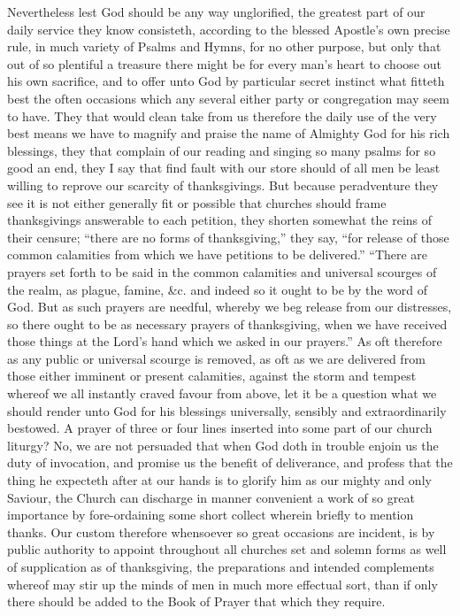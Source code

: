 Nevertheless lest God should be any way unglorified, the greatest part of our daily service they know consisteth, according to the blessed Apostle’s own precise rule, in much variety of Psalms and Hymns, for no other purpose, but only that out of so plentiful a treasure there might be for every man’s heart to choose out his own sacrifice, and to offer unto God by particular secret instinct what fitteth best the often occasions which any several either party or congregation may seem to have. They that would clean take from us therefore the daily use of the very best means we have to magnify and praise the name of Almighty God for his rich blessings, they that complain of our reading and singing so many psalms for so good an end, they I say that find fault with our store should of all men be least willing to reprove our scarcity of thanksgivings.
But because peradventure they see it is not either generally fit or possible that churches should frame thanksgivings answerable to each petition, they shorten somewhat the reins of their censure; “there are no forms of thanksgiving,” they say, “for release of those common calamities from which we have petitions to be delivered.” “There are prayers set forth to be said in the common calamities and universal scourges of the realm, as plague, famine, \&c. and indeed so it ought to be by the word of God. But as such prayers are needful, whereby we beg release from our distresses, so there ought to be as necessary prayers of thanksgiving, when we have received those things at the Lord’s hand which we asked in our prayers.” As oft therefore as any public or universal scourge is removed, as oft as we are delivered from those either imminent or present calamities, against the storm and tempest whereof we all instantly craved favour from above, let it be a question what we should render unto God for his blessings universally, sensibly and extraordinarily bestowed. A prayer of three or four lines inserted into some part of our church liturgy? No, we are not persuaded that when God doth in trouble enjoin us the duty of invocation, and promise us the benefit of deliverance, and profess that the thing he expecteth  after at our hands is to glorify him as our mighty and only Saviour, the Church can discharge in manner convenient a work of so great importance by fore-ordaining some short collect wherein briefly to mention thanks. Our custom therefore whensoever so great occasions are incident, is by public authority to appoint throughout all churches set and solemn forms as well of supplication as of thanksgiving, the preparations and intended complements whereof may stir up the minds of men in much more effectual sort, than if only there should be added to the Book of Prayer that which they require.
